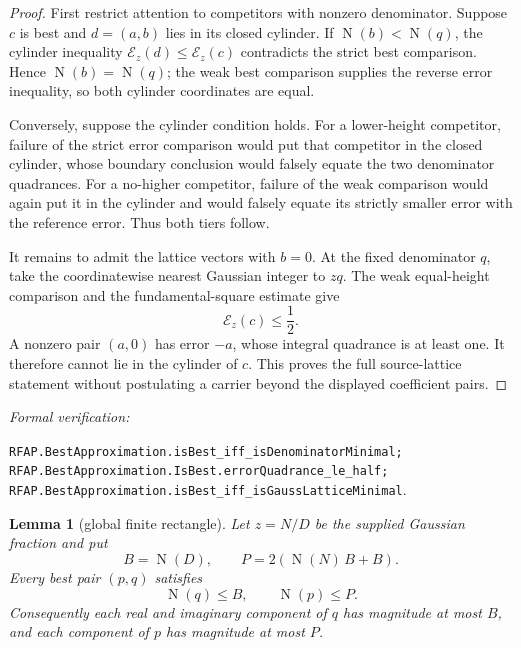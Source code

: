 \documentclass[11pt]{article}
\newtheorem{lemma}[lemma]{Lemma}
\newcommand{\Norm}[1]{\operatorname{N}\!\left(#1\right)}
\newcommand{\leanref}[1]{\par\smallskip\noindent
  \emph{Formal verification:}\par\nobreak
  {\raggedright\nolinkurl{#1}.\par}}
\begin{document}
\begin{proof}
First restrict attention to competitors with nonzero denominator.  Suppose
$c$ is best and $d=(a,b)$ lies in its closed cylinder.  If
$\Norm b<\Norm q$, the cylinder inequality
$\mathcal E_z(d)\le\mathcal E_z(c)$ contradicts the strict best comparison.
Hence $\Norm b=\Norm q$; the weak best comparison supplies the reverse error
inequality, so both cylinder coordinates are equal.

Conversely, suppose the cylinder condition holds.  For a lower-height
competitor, failure of the strict error comparison would put that competitor
in the closed cylinder, whose boundary conclusion would falsely equate the
two denominator quadrances.  For a no-higher competitor, failure of the weak
comparison would again put it in the cylinder and would falsely equate its
strictly smaller error with the reference error.  Thus both tiers follow.

It remains to admit the lattice vectors with $b=0$.  At the fixed denominator
$q$, take the coordinatewise nearest Gaussian integer to $zq$.  The weak
equal-height comparison and the fundamental-square estimate give
\begin{equation}
\label{eq:best-error-half}
                         \mathcal E_z(c)\le\frac12.
\end{equation}
A nonzero pair $(a,0)$ has error $-a$, whose integral quadrance is at least
one.  It therefore cannot lie in the cylinder of $c$.  This proves the full
source-lattice statement without postulating a carrier beyond the displayed
coefficient pairs.
\end{proof}

\leanref{RFAP.BestApproximation.isBest_iff_isDenominatorMinimal;
RFAP.BestApproximation.IsBest.errorQuadrance_le_half;
RFAP.BestApproximation.isBest_iff_isGaussLatticeMinimal}

\begin{lemma}[global finite rectangle]
\label{lem:all-best-rectangle}
Let $z=N/D$ be the supplied Gaussian fraction and put
\begin{equation}
\label{eq:all-best-bounds}
                 B=\Norm D,
        \qquad   P=2(\Norm N\,B+B).
\end{equation}
Every best pair $(p,q)$ satisfies
\begin{equation}
\label{eq:all-best-norm-bounds}
                         \Norm q\le B,
             \qquad     \Norm p\le P.
\end{equation}
Consequently each real and imaginary component of $q$ has magnitude at most
$B$, and each component of $p$ has magnitude at most $P$.
\end{lemma}
\end{document}
